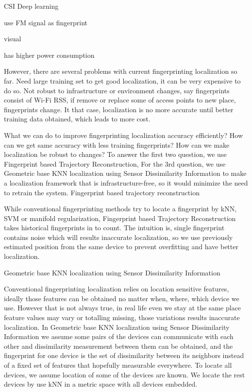 CSI Deep learning

\cite{chen2012fm} use FM signal as fingerprint

visual

has higher power consumption

However, there are several problems with current fingerprinting localization so far. Need large training set to get good localization, it can be very expensive to do so. Not robust to infrastructure or environment changes, say fingerprints consist of Wi-Fi RSS, if remove or replace some of access points to new place, fingerprints change. It that case, localization is no more accurate until better training data obtained, which leads to more cost.

What we can do to improve fingerprinting localization accuracy efficiently? How can we get same accuracy with less training fingerprints? How can we make localization be robust to changes? To answer the first two question, we use Fingerprint based Trajectory Reconstruction, For the 3rd question, we use Geometric base KNN localization using Sensor Dissimilarity Information to make a localization framework that is infrastructure-free, so it would minimize the need to retrain the system.
Fingerprint based trajectory reconstruction

While conventional fingerprinting methods try to locate a fingerprint by kNN, SVM or manifold regularization, Fingerprint based Trajectory Reconstruction takes historical fingerprints in to count. The intuition is, single fingerprint contains noise which will results inaccurate localization, so we use previously estimated position from the same device to prevent overfitting and have better localization.
 
Geometric base KNN localization using Sensor Dissimilarity Information

Conventional fingerprinting localization relies on location sensitive features, ideally those features can be obtained no matter when, where, which device we use. However that is not always true, in real life even we stay at the same place feature values may vary or totalling missing, those variations results inaccurate localization. In Geometric base KNN localization using Sensor Dissimilarity Information we assume some pairs of the devices can communicate with each other and dissimilarity measurement between them can be obtained, and the fingerprint for one device is the set of dissimilarity between its neighbors instead of a fixed set of features that hopefully measurable everywhere. To locate all devices, we assume location of some of the devices are known. We locate the rest devices by use kNN in a metric space with all devices embedded.
